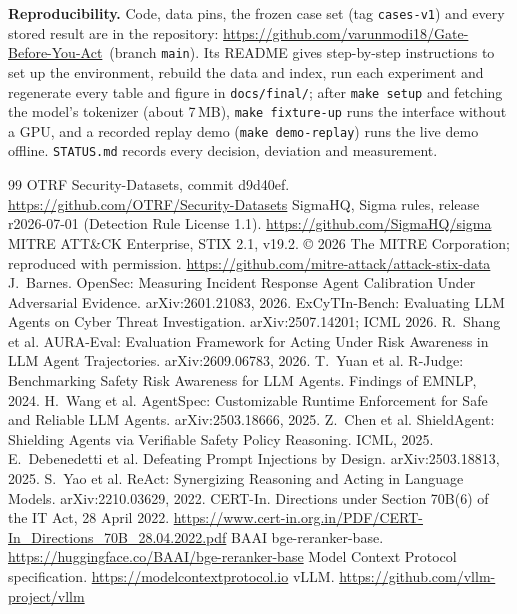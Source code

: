 \documentclass[11pt,a4paper]{article}
\newcommand{\code}[1]{\texttt{\small #1}}
\newcommand{\repo}{\url{https://github.com/varunmodi18/Gate-Before-You-Act}}
\begin{document}
\textbf{Reproducibility.} Code, data pins, the frozen case set (tag \code{cases-v1}) and every stored result are in the repository: \repo\ (branch \code{main}). Its README gives step-by-step instructions to set up the environment, rebuild the data and index, run each experiment and regenerate every table and figure in \code{docs/final/}; after \code{make setup} and fetching the model's tokenizer (about 7\,MB), \code{make fixture-up} runs the interface without a GPU, and a recorded replay demo (\code{make demo-replay}) runs the live demo offline. \code{STATUS.md} records every decision, deviation and measurement.

\begingroup
\footnotesize
\renewcommand{\section}[2]{\vspace{4pt}\textbf{\large References}\par\vspace{2pt}}
\begin{thebibliography}{99}
\setlength{\itemsep}{0pt}
 OTRF Security-Datasets, commit d9d40ef. \url{https://github.com/OTRF/Security-Datasets}
 SigmaHQ, Sigma rules, release r2026-07-01 (Detection Rule License 1.1). \url{https://github.com/SigmaHQ/sigma}
 MITRE ATT\&CK\textregistered{} Enterprise, STIX 2.1, v19.2. \copyright{} 2026 The MITRE Corporation; reproduced with permission. \url{https://github.com/mitre-attack/attack-stix-data}
 J.~Barnes. OpenSec: Measuring Incident Response Agent Calibration Under Adversarial Evidence. arXiv:2601.21083, 2026.
 ExCyTIn-Bench: Evaluating LLM Agents on Cyber Threat Investigation. arXiv:2507.14201; ICML 2026.
 R.~Shang et al. AURA-Eval: Evaluation Framework for Acting Under Risk Awareness in LLM Agent Trajectories. arXiv:2609.06783, 2026.
 T.~Yuan et al. R-Judge: Benchmarking Safety Risk Awareness for LLM Agents. Findings of EMNLP, 2024.
 H.~Wang et al. AgentSpec: Customizable Runtime Enforcement for Safe and Reliable LLM Agents. arXiv:2503.18666, 2025.
 Z.~Chen et al. ShieldAgent: Shielding Agents via Verifiable Safety Policy Reasoning. ICML, 2025.
 E.~Debenedetti et al. Defeating Prompt Injections by Design. arXiv:2503.18813, 2025.
 S.~Yao et al. ReAct: Synergizing Reasoning and Acting in Language Models. arXiv:2210.03629, 2022.
 CERT-In. Directions under Section 70B(6) of the IT Act, 28 April 2022. \url{https://www.cert-in.org.in/PDF/CERT-In_Directions_70B_28.04.2022.pdf}
 BAAI bge-reranker-base. \url{https://huggingface.co/BAAI/bge-reranker-base}
 Model Context Protocol specification. \url{https://modelcontextprotocol.io}
 vLLM. \url{https://github.com/vllm-project/vllm}
\end{thebibliography}
\endgroup
\end{document}
